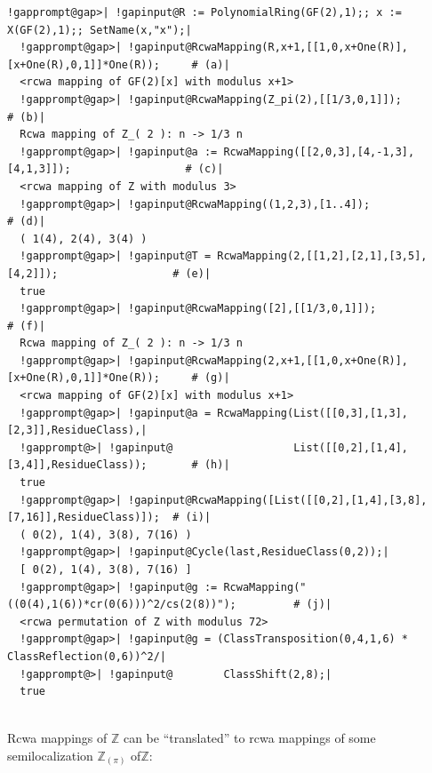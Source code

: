 \documentclass[a4paper,11pt]{report}
\begin{document}
{{{\begin{Verbatim}[commandchars=!@|,fontsize=\small,frame=single,label=Example]
  !gapprompt@gap>| !gapinput@R := PolynomialRing(GF(2),1);; x := X(GF(2),1);; SetName(x,"x");|
  !gapprompt@gap>| !gapinput@RcwaMapping(R,x+1,[[1,0,x+One(R)],[x+One(R),0,1]]*One(R));     # (a)|
  <rcwa mapping of GF(2)[x] with modulus x+1>
  !gapprompt@gap>| !gapinput@RcwaMapping(Z_pi(2),[[1/3,0,1]]);                              # (b)|
  Rcwa mapping of Z_( 2 ): n -> 1/3 n
  !gapprompt@gap>| !gapinput@a := RcwaMapping([[2,0,3],[4,-1,3],[4,1,3]]);                  # (c)|
  <rcwa mapping of Z with modulus 3>
  !gapprompt@gap>| !gapinput@RcwaMapping((1,2,3),[1..4]);                                   # (d)|
  ( 1(4), 2(4), 3(4) )
  !gapprompt@gap>| !gapinput@T = RcwaMapping(2,[[1,2],[2,1],[3,5],[4,2]]);                  # (e)|
  true
  !gapprompt@gap>| !gapinput@RcwaMapping([2],[[1/3,0,1]]);                                  # (f)|
  Rcwa mapping of Z_( 2 ): n -> 1/3 n
  !gapprompt@gap>| !gapinput@RcwaMapping(2,x+1,[[1,0,x+One(R)],[x+One(R),0,1]]*One(R));     # (g)|
  <rcwa mapping of GF(2)[x] with modulus x+1>
  !gapprompt@gap>| !gapinput@a = RcwaMapping(List([[0,3],[1,3],[2,3]],ResidueClass),|
  !gapprompt@>| !gapinput@                   List([[0,2],[1,4],[3,4]],ResidueClass));       # (h)|
  true
  !gapprompt@gap>| !gapinput@RcwaMapping([List([[0,2],[1,4],[3,8],[7,16]],ResidueClass)]);  # (i)|
  ( 0(2), 1(4), 3(8), 7(16) )
  !gapprompt@gap>| !gapinput@Cycle(last,ResidueClass(0,2));|
  [ 0(2), 1(4), 3(8), 7(16) ]
  !gapprompt@gap>| !gapinput@g := RcwaMapping("((0(4),1(6))*cr(0(6)))^2/cs(2(8))");         # (j)|
  <rcwa permutation of Z with modulus 72>
  !gapprompt@gap>| !gapinput@g = (ClassTransposition(0,4,1,6) * ClassReflection(0,6))^2/|
  !gapprompt@>| !gapinput@        ClassShift(2,8);|
  true
  
\end{Verbatim}
 }

 Rcwa mappings of {\ensuremath{\mathbb Z}} can be ``translated'' to rcwa mappings of some semilocalization ${\ensuremath{\mathbb Z}}_{(\pi)}$ of{\nobreakspace}{\ensuremath{\mathbb Z}}: 

}}
\end{document}
